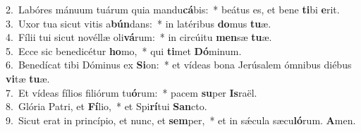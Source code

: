 {2.~}Labóres mánuum tuárum quia mandu\textbf{cá}bis:~* beátus es, et bene \textbf{ti}bi \textbf{e}rit.\\
{3.~}Uxor tua sicut vitis a\textbf{bún}dans:~* in latéribus \textbf{do}mus \textbf{tu}æ.\\
{4.~}Fílii tui sicut novéllæ oli\textbf{vá}rum:~* in circúitu \textbf{men}sæ \textbf{tu}æ.\\
{5.~}Ecce sic benedicétur \textbf{ho}mo,~* qui \textbf{ti}met \textbf{Dó}minum.\\
{6.~}Benedícat tibi Dóminus ex \textbf{Si}on:~* et vídeas bona Jerúsalem ómnibus diébus \textbf{vi}tæ \textbf{tu}æ.\\
{7.~}Et vídeas fílios filiórum tu\textbf{ó}rum:~* pacem \textbf{su}per \textbf{Is}raël.\\
{8.~}Glória Patri, et \textbf{Fí}lio,~* et Spi\textbf{rí}tui \textbf{San}cto.\\
{9.~}Sicut erat in princípio, et nunc, et \textbf{sem}per,~* et in sǽcula sæcu\textbf{ló}rum. \textbf{A}men.\\
